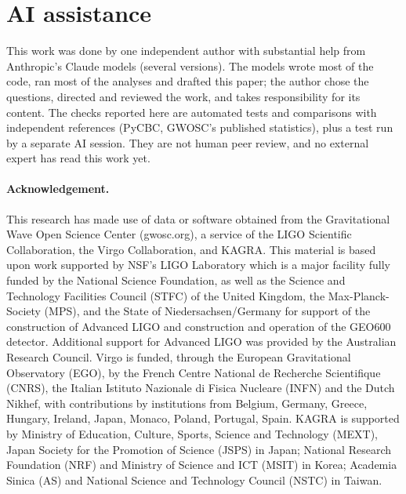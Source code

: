 \documentclass[11pt]{article}
\begin{document}
\section{AI assistance}
This work was done by one independent author with substantial help from Anthropic's Claude models (several
versions). The models wrote most of the code, ran most of the analyses and drafted this paper; the author chose the
questions, directed and reviewed the work, and takes responsibility for its content. The checks reported here are
automated tests and comparisons with independent references (PyCBC, GWOSC's published statistics), plus a test run
by a separate AI session. They are not human peer review, and no external expert has read this work yet.

\paragraph{Acknowledgement.} This research has made use of data or software obtained from the Gravitational Wave Open
Science Center (gwosc.org), a service of the LIGO Scientific Collaboration, the Virgo Collaboration, and KAGRA. This
material is based upon work supported by NSF's LIGO Laboratory which is a major facility fully funded by the National
Science Foundation, as well as the Science and Technology Facilities Council (STFC) of the United Kingdom, the
Max-Planck-Society (MPS), and the State of Niedersachsen/Germany for support of the construction of Advanced LIGO and
construction and operation of the GEO600 detector. Additional support for Advanced LIGO was provided by the
Australian Research Council. Virgo is funded, through the European Gravitational Observatory (EGO), by the French
Centre National de Recherche Scientifique (CNRS), the Italian Istituto Nazionale di Fisica Nucleare (INFN) and the
Dutch Nikhef, with contributions by institutions from Belgium, Germany, Greece, Hungary, Ireland, Japan, Monaco,
Poland, Portugal, Spain. KAGRA is supported by Ministry of Education, Culture, Sports, Science and Technology (MEXT),
Japan Society for the Promotion of Science (JSPS) in Japan; National Research Foundation (NRF) and Ministry of Science
and ICT (MSIT) in Korea; Academia Sinica (AS) and National Science and Technology Council (NSTC) in Taiwan.
\end{document}
